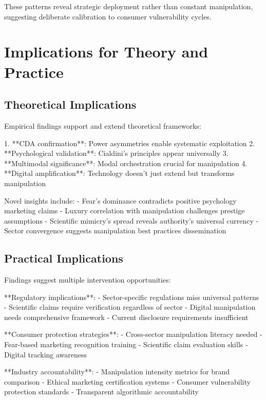 These patterns reveal strategic deployment rather than constant manipulation, suggesting deliberate calibration to consumer vulnerability cycles.

\section{Implications for Theory and Practice}
\label{sec:empirical_implications}

\subsection{Theoretical Implications}

Empirical findings support and extend theoretical frameworks:

1. **CDA confirmation**: Power asymmetries enable systematic exploitation
2. **Psychological validation**: Cialdini's principles appear universally
3. **Multimodal significance**: Modal orchestration crucial for manipulation
4. **Digital amplification**: Technology doesn't just extend but transforms manipulation

Novel insights include:
- Fear's dominance contradicts positive psychology marketing claims
- Luxury correlation with manipulation challenges prestige assumptions
- Scientific mimicry's spread reveals authority's universal currency
- Sector convergence suggests manipulation best practices dissemination

\subsection{Practical Implications}

Findings suggest multiple intervention opportunities:

**Regulatory implications**:
- Sector-specific regulations miss universal patterns
- Scientific claims require verification regardless of sector
- Digital manipulation needs comprehensive framework
- Current disclosure requirements insufficient

**Consumer protection strategies**:
- Cross-sector manipulation literacy needed
- Fear-based marketing recognition training
- Scientific claim evaluation skills
- Digital tracking awareness

**Industry accountability**:
- Manipulation intensity metrics for brand comparison
- Ethical marketing certification systems
- Consumer vulnerability protection standards
- Transparent algorithmic accountability

